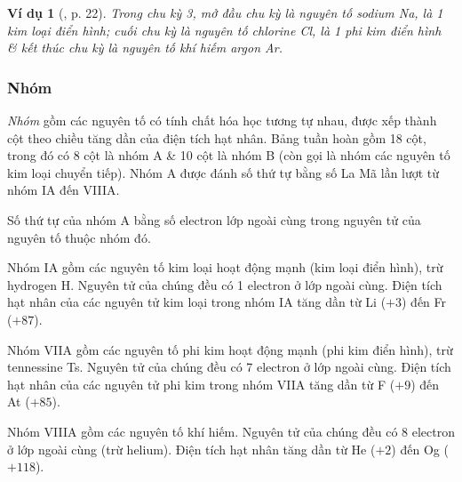\documentclass{article}
\newtheorem{vidu}{Ví dụ}
\begin{document}
\begin{vidu}[\cite{SGK_KHTN_7_Canh_Dieu}, p. 22]
	 Trong chu kỳ 3, mở đầu chu kỳ là nguyên tố sodium \emph{Na}, là 1 kim loại điển hình; cuối chu kỳ là nguyên tố chlorine \emph{Cl}, là 1 phi kim điển hình \& kết thúc chu kỳ là nguyên tố khí hiếm argon \emph{Ar}.
\end{vidu}

\subsubsection{Nhóm}
\textit{Nhóm} gồm các nguyên tố có tính chất hóa học tương tự nhau, được xếp thành cột theo chiều tăng dần của điện tích hạt nhân. Bảng tuần hoàn gồm 18 cột, trong đó có 8 cột là nhóm A \& 10 cột là nhóm B (còn gọi là nhóm các nguyên tố kim loại chuyển tiếp). Nhóm A được đánh số thứ tự bằng số La Mã lần lượt từ nhóm IA đến VIIIA.

Số thứ tự của nhóm A bằng số electron lớp ngoài cùng trong nguyên tử của nguyên tố thuộc nhóm đó.

Nhóm IA gồm các nguyên tố kim loại hoạt động mạnh (kim loại điển hình), trừ hydrogen H. Nguyên tử của chúng đều có 1 electron ở lớp ngoài cùng. Điện tích hạt nhân của các nguyên tử kim loại trong nhóm IA tăng dần từ Li ($+3$) đến Fr ($+87$).

Nhóm VIIA gồm các nguyên tố phi kim hoạt động mạnh (phi kim điển hình), trừ tennessine Ts. Nguyên tử của chúng đều có 7 electron ở lớp ngoài cùng. Điện tích hạt nhân của các nguyên tử phi kim trong nhóm VIIA tăng dần từ F ($+9$) đến At ($+85$).

Nhóm VIIIA gồm các nguyên tố khí hiếm. Nguyên tử của chúng đều có 8 electron ở lớp ngoài cùng (trừ helium). Điện tích hạt nhân tăng dần từ He ($+2$) đến Og ($+118$).
\end{document}
